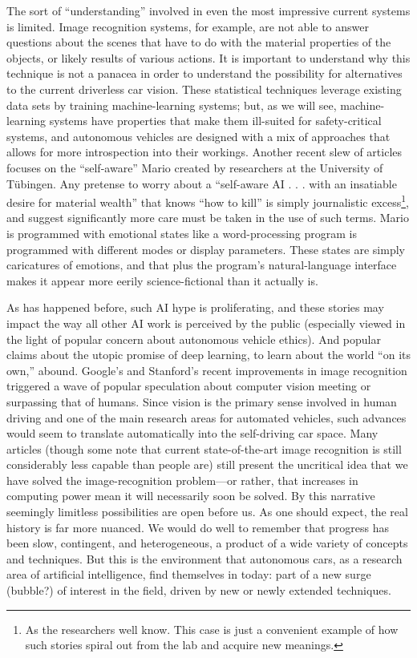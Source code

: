 The sort of ``understanding''
involved in even the most impressive current systems is limited. Image
recognition systems, for example, are not
able to answer questions about the scenes that have to do with
the material properties of the objects, or likely results of various
actions.\cite{gomesJordan} It is important to understand why this technique is not a
panacea in order to understand the possibility for alternatives to the current
driverless car vision. These statistical techniques leverage existing data
sets by training machine-learning systems; but, as we will see,
machine-learning systems have properties that make them ill-suited for
safety-critical systems, and autonomous vehicles are designed with a
mix of approaches that allows for more introspection into their
workings. Another recent slew of articles focuses on
the ``self-aware'' Mario created by researchers at the University of
T\"{u}bingen. Any pretense to worry about a ``self-aware AI . . . with
an insatiable desire for material wealth'' that knows ``how to kill''\cite{vincentMario}
is simply journalistic excess\footnote{As the
  researchers well know. This case is just a convenient example of how
such stories spiral out from the lab and acquire new meanings.}, and suggest
significantly more care must be taken in the use of such terms. Mario
is programmed with emotional states like a word-processing program is
programmed with different modes or display parameters. These states
are simply caricatures of emotions, and that plus the program's
natural-language interface makes it appear more eerily science-fictional than it
actually is.

As has happened before, such AI hype is proliferating, and these
stories may impact the way all other AI work is
perceived by the public (especially viewed in the light of
popular concern about autonomous vehicle ethics). And popular claims
about the utopic promise of deep learning, to
learn about the world ``on its own,''
abound. Google's and Stanford's recent
improvements in image recognition\cite{markoffImage} triggered a wave
of popular speculation about computer vision meeting or surpassing
that of humans. Since vision is the primary sense involved in human driving
and one of the main research areas for automated vehicles, such
advances would seem to translate automatically into the self-driving
car space. Many articles (though some note that current
state-of-the-art image recognition is still considerably less capable
than people are) still present the uncritical idea that we have solved
the image-recognition problem---or rather, that increases in computing
power mean it will necessarily soon be solved. By this narrative seemingly limitless
possibilities are open before us. As one should expect, the real
history is far more nuanced. We would do well to remember that
progress has been slow, contingent, and heterogeneous, a product of a
wide variety of concepts and techniques. But
this is the environment that autonomous cars, as a
research area of artificial intelligence, find themselves in today:
part of a new surge (bubble?) of interest in the field, driven by new
or newly extended techniques. 


